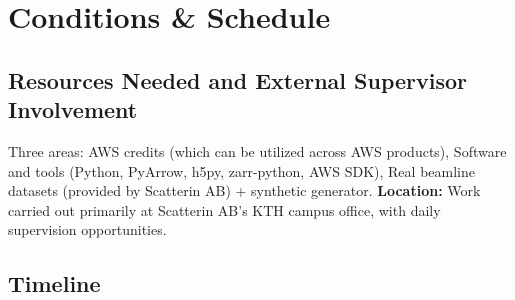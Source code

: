 \documentclass{article}
\begin{document}
\section{Conditions \& Schedule}

\subsection{Resources Needed and External Supervisor Involvement}
Three areas: AWS credits (which can be utilized across AWS products), Software and tools (Python, PyArrow, h5py, zarr-python, AWS SDK), Real beamline datasets (provided by Scatterin AB) + synthetic generator. \textbf{Location:} Work carried out primarily at Scatterin AB’s KTH campus office, with daily supervision opportunities.

\subsection{Timeline}
\end{document}
